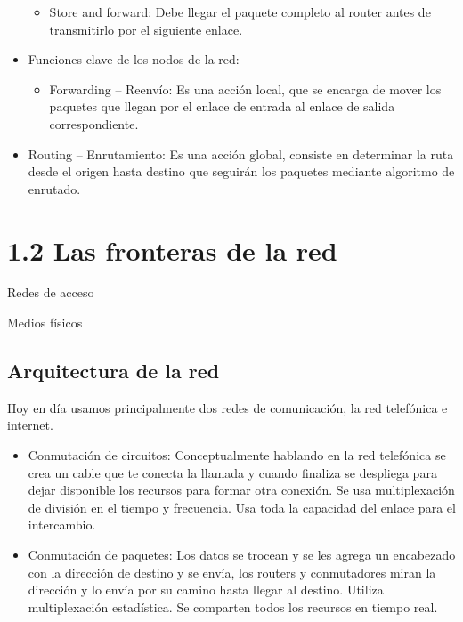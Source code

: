\documentclass[12pt, twoside, openright]{report} %
\begin{document}
\begin{itemize}
	      \begin{itemize}
		      \item Store and forward: Debe llegar el paquete completo al router antes
		            de transmitirlo por el siguiente enlace.
	      \end{itemize}
	\item Funciones clave de los nodos de la red:

	      \begin{itemize}
		      \item Forwarding -- Reenvío: Es una acción local, que se encarga de
		            mover los paquetes que llegan por el enlace de entrada al enlace
		            de salida correspondiente.
	      \end{itemize}
	\item Routing -- Enrutamiento: Es una acción global, consiste en
	      determinar la ruta desde el origen hasta destino que seguirán los
	      paquetes mediante algoritmo de enrutado.
\end{itemize}

\section{1.2 Las fronteras de la red}

Redes de acceso

Medios físicos

\subsection{Arquitectura de la red}

Hoy en día usamos principalmente dos redes de comunicación, la red
telefónica e internet.

\begin{itemize}
	\item Conmutación de circuitos: Conceptualmente hablando en la red
	      telefónica se crea un cable que te conecta la llamada y cuando
	      finaliza se despliega para dejar disponible los recursos para formar
	      otra conexión. Se usa multiplexación de división en el tiempo y
	      frecuencia. Usa toda la capacidad del enlace para el intercambio.
	\item Conmutación de paquetes: Los datos se trocean y se les agrega un
	      encabezado con la dirección de destino y se envía, los routers y
	      conmutadores miran la dirección y lo envía por su camino hasta llegar
	      al destino. Utiliza multiplexación estadística. Se comparten todos los
	      recursos en tiempo real.
\end{itemize}
\end{document}
